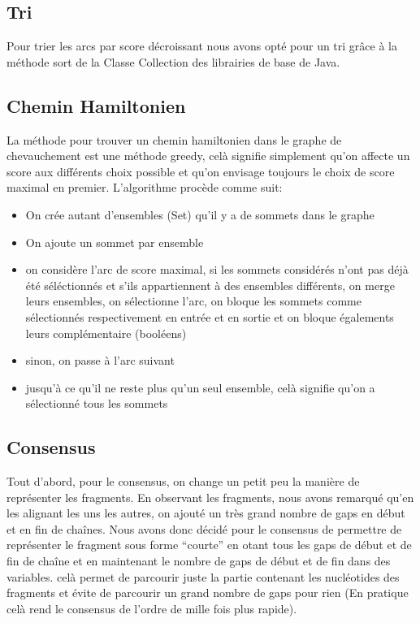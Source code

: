 \documentclass[a4paper]{article}
\begin{document}
\subsection{Tri}
Pour trier les arcs par score décroissant nous avons opté pour un tri grâce à la méthode sort de la Classe Collection des librairies de base de Java.

\subsection{Chemin Hamiltonien}

La méthode pour trouver un chemin hamiltonien dans le graphe de chevauchement
est une méthode greedy, celà signifie simplement qu'on affecte un
score aux différents choix possible et qu'on envisage toujours le
choix de score maximal en premier. L'algorithme procède comme suit:
\begin{itemize}
\item On crée autant d'ensembles (Set) qu'il y a de sommets dans le graphe
\item On ajoute un sommet par ensemble
\item on considère l'arc de score maximal, si les sommets considérés n'ont
pas déjà été séléctionnés et s'ils appartiennent à des ensembles différents,
on merge leurs ensembles, on sélectionne l'arc, on bloque les sommets
comme sélectionnés respectivement en entrée et en sortie et on bloque
égalements leurs complémentaire (booléens)
\item sinon, on passe à l'arc suivant
\item jusqu'à ce qu'il ne reste plus qu'un seul ensemble, celà signifie
qu'on a sélectionné tous les sommets
\end{itemize}

\subsection{Consensus}

Tout d'abord, pour le consensus, on change un petit peu la manière
de représenter les fragments. En observant les fragments, nous avons
remarqué qu'en les alignant les uns les autres, on ajouté un très
grand nombre de gaps en début et en fin de chaînes. Nous avons donc
décidé pour le consensus de permettre de représenter le fragment sous
forme ``courte'' en otant tous les gaps de début et de fin de chaîne
et en maintenant le nombre de gaps de début et de fin dans des variables.
celà permet de parcourir juste la partie contenant les nucléotides
des fragments et évite de parcourir un grand nombre de gaps pour rien
(En pratique celà rend le consensus de l'ordre de mille fois plus
rapide).
\end{document}
